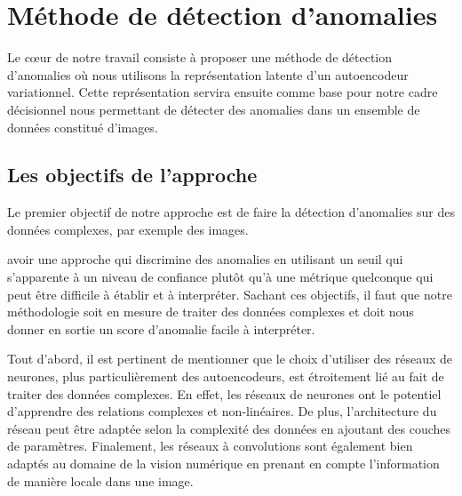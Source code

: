 \chapter{Méthode de détection d'anomalies}     %
\label{chap:methodologie}                   %

Le cœur de notre travail consiste à proposer une méthode de détection d'anomalies où nous utilisons la représentation latente d'un autoencodeur variationnel. Cette représentation servira ensuite comme base pour notre cadre décisionnel nous permettant de détecter des anomalies dans un ensemble de données constitué d'images.

\section{Les objectifs de l'approche} \label{objectifs_metho}

Le premier objectif de notre approche est de faire la détection d'anomalies sur des données complexes, par exemple des images. \DIFdelbegin {}\DIFdelend \DIFaddbegin {}

\DIFaddend avoir une approche qui discrimine des anomalies en utilisant un seuil qui s'apparente à un niveau de confiance plutôt qu'à une métrique quelconque qui peut être difficile à établir et à interpréter. Sachant ces objectifs, il faut que notre méthodologie soit en mesure de traiter des données complexes et doit nous donner en sortie un score d'anomalie facile à interpréter.

Tout d'abord, il est pertinent de mentionner que le choix d'utiliser des réseaux de neurones, plus particulièrement des autoencodeurs, est étroitement lié au fait de traiter des données complexes. En effet, les réseaux de neurones ont le potentiel d'apprendre des relations complexes et non-linéaires. De plus, l'architecture du réseau peut être adaptée selon la complexité des données en ajoutant des couches de paramètres. Finalement, les réseaux à convolutions sont également bien adaptés au domaine de la vision numérique en prenant en compte l'information de manière locale dans une image.

